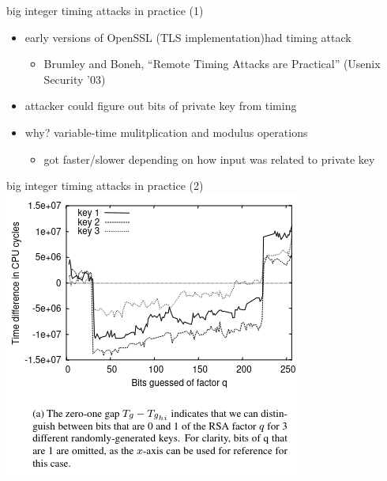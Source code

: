 \begin{frame}{big integer timing attacks in practice (1)}
    \begin{itemize}
    \item early versions of OpenSSL (TLS implementation)had timing attack
        \begin{itemize}
        \item Brumley and Boneh, ``Remote Timing Attacks are Practical'' (Usenix Security '03)
        \end{itemize}
    \item attacker could figure out bits of private key from timing
    \vspace{.5cm}
    \item why? variable-time mulitplication and modulus operations 
        \begin{itemize}
        \item got faster/slower depending on how input was related to private key
        \end{itemize}
    \end{itemize}
\end{frame}

\begin{frame}{big integer timing attacks in practice (2)}
    \includegraphics[height=0.9\textheight]{../spectre/remote-timing-prac-fig3a}
\end{frame}

